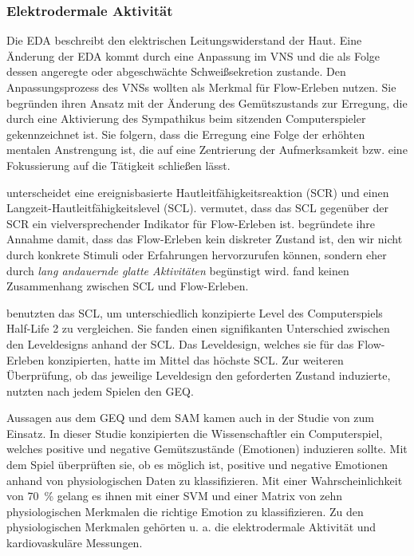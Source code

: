 \subsubsection{Elektrodermale Aktivität} 

\label{ssub:elektrodermale_aktivitat}

Die \ac{EDA} beschreibt den elektrischen Leitungswiderstand der Haut. Eine Änderung der \ac{EDA} kommt durch eine Anpassung im \ac{VNS} und die als Folge dessen angeregte oder abgeschwächte Schweißsekretion zustande. Den Anpassungsprozess des \ac{VNS}s wollten \citet{Kivikangas2006, Nacke2008} als Merkmal für Flow-Erleben nutzen. Sie begründen ihren Ansatz mit der Änderung des Gemütszustands zur Erregung, die durch eine Aktivierung des Sympathikus beim sitzenden Computerspieler gekennzeichnet ist. Sie folgern, dass die Erregung eine Folge der erhöhten mentalen Anstrengung ist, die auf eine Zentrierung der Aufmerksamkeit bzw. eine Fokussierung auf die Tätigkeit schließen lässt.

\citet{Kilpatrick1972} unterscheidet eine ereignisbasierte Hautleitfähigkeitsreaktion (\ac{SCR}) und einen Langzeit-Hautleitfähigkeitslevel (\ac{SCL}). \citet[][S.~158]{Peifer2012} vermutet, dass das \ac{SCL} gegenüber der \ac{SCR} ein vielversprechender Indikator für Flow-Erleben ist. \citet[][S.~158]{Peifer2012} begründete ihre Annahme damit, dass das Flow-Erleben kein diskreter Zustand ist, den wir nicht durch konkrete Stimuli oder Erfahrungen hervorzurufen können, sondern eher durch \emph{lang andauernde glatte Aktivitäten} begünstigt wird. \citet{Kilpatrick1972} fand keinen Zusammenhang zwischen \ac{SCL} und Flow-Erleben. 

\citet{Nacke2008} benutzten das \ac{SCL}, um unterschiedlich konzipierte Level des Computerspiels Half-Life 2 zu vergleichen. Sie fanden einen signifikanten Unterschied zwischen den Leveldesigns anhand der \ac{SCL}. Das Leveldesign, welches sie für das Flow-Erleben konzipierten, hatte im Mittel das höchste \ac{SCL}. Zur weiteren Überprüfung, ob das jeweilige Leveldesign den geforderten Zustand induzierte, nutzten \citet{Nacke2008} nach jedem Spielen den \ac{GEQ}.

Aussagen aus dem \ac{GEQ} und dem \ac{SAM} kamen auch in der Studie von \citet{Friedrichs2015} zum Einsatz. In dieser Studie konzipierten die Wissenschaftler ein Computerspiel, welches positive und negative Gemütszustände (Emotionen) induzieren sollte. Mit dem Spiel überprüften sie, ob es möglich ist, positive und negative Emotionen anhand von physiologischen Daten zu klassifizieren. Mit einer Wahrscheinlichkeit von 70~\% gelang es ihnen mit einer \ac{SVM} und einer Matrix von zehn physiologischen Merkmalen die richtige Emotion zu klassifizieren. Zu den physiologischen Merkmalen gehörten u. a. die elektrodermale Aktivität und kardiovaskuläre Messungen.

